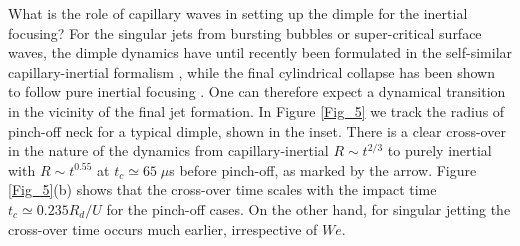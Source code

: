 \documentclass[10pt, a4paper]{article}
\begin{document}
What is the role of capillary waves in setting up the dimple for the inertial focusing?
For the singular jets from bursting bubbles or super-critical surface waves, 
the dimple dynamics have until recently been formulated in the self-similar capillary-inertial formalism \cite{Ref10, Ref11}, 
while the final cylindrical collapse has been shown to follow pure inertial focusing \cite{Ref7,Ref12}.
One can therefore expect a dynamical transition in the vicinity of the final jet formation.
In Figure \ref{Fig_5} we track the radius of pinch-off neck for a typical dimple, shown in the inset.
There is a clear cross-over in the nature of the dynamics from capillary-inertial $R\sim t^{2/3}$ 
to purely inertial with $R\sim t^{0.55}$ \cite{Ref3,Ref7} at $t_c \simeq 65\; \mu$s before pinch-off, as marked by the arrow.
Figure \ref{Fig_5}(b) shows that the cross-over time scales with the impact time $t_c \simeq 0.235 R_d/U$ for the pinch-off cases.
On the other hand, for singular jetting the cross-over time occurs much earlier, 
irrespective of $We$.
\end{document}
